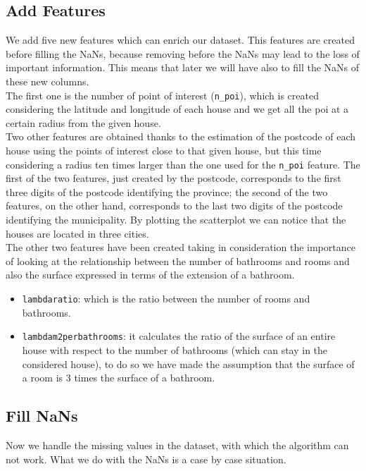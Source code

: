 \documentclass[10pt, notitlepage]{article}
\begin{document}
\subsection{Add Features}
\color{black}
We add five new features which can enrich our dataset. This features are created before filling the NaNs, because removing before the NaNs may lead to the loss of important information. This means that later we will have also to fill the NaNs of these new columns. 
\\
The first one is the number of point of interest (\texttt{n\_poi}), which is created considering the latitude and longitude of each house and we get all the poi at a certain radius from the given house. 
\\
Two other features are obtained thanks to the estimation of the postcode of each house using the points of interest close to that given house, but this time considering a radius ten times larger than the one used for the \texttt{n\_poi} feature. The first of the two features, just created by the postcode, corresponds to the first three digits of the postcode identifying the province; the second of the two features, on the other hand, corresponds to the last two digits of the postcode identifying the municipality. By plotting the scatterplot we can notice that the houses are located in three cities. 
\\
The other two features have been created taking in consideration the importance of looking at the relationship between the number of bathrooms and rooms and also the surface expressed in terms of the extension of a bathroom. 
\begin{itemize}
    \item \texttt{lambda\textunderscore ratio}: which is the ratio between the number of rooms and bathrooms.
    \item \texttt{lambda\textunderscore m2\textunderscore per\textunderscore bathrooms}: it calculates the ratio of the surface of an entire house with respect to the number of bathrooms (which can stay in the considered house), to do so we have made the assumption that the surface of a room is 3 times the surface of a bathroom. 
\end{itemize}

\color{blue}
\subsection{Fill NaNs}
\color{black}
Now we handle the missing values in the dataset, with which the algorithm can not work. What we do with the NaNs is a case by case situation. 
\end{document}

